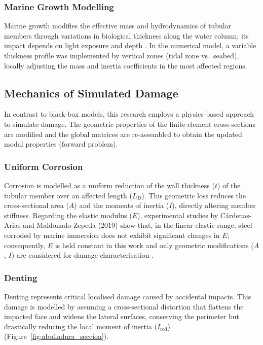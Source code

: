 \documentclass[a4paper,fleqn,nologo]{cas-dc}
\begin{document}
\subsubsection{Marine Growth Modelling}

Marine growth modifies the effective mass and hydrodynamics of tubular members through variations in biological thickness along the water column; its impact depends on light exposure and depth \citep{birci2020integrity,salama2020shm}. In the numerical model, a variable thickness profile was implemented by vertical zones (tidal zone vs.\ seabed), locally adjusting the mass and inertia coefficients in the most affected regions.

\FloatBarrier
\subsection{Mechanics of Simulated Damage}

In contrast to black-box models, this research employs a physics-based approach to simulate damage. The geometric properties of the finite-element cross-sections are modified and the global matrices are re-assembled to obtain the updated modal properties (forward problem).

\subsubsection{Uniform Corrosion}
Corrosion is modelled as a uniform reduction of the wall thickness ($t$) of the tubular member over an affected length ($L_D$). This geometric loss reduces the cross-sectional area ($A$) and the moments of inertia ($I$), directly altering member stiffness. Regarding the elastic modulus ($E$), experimental studies by C\'{a}rdenas-Arias and Maldonado-Zepeda (2019) show that, in the linear elastic range, steel corroded by marine immersion does not exhibit significant changes in $E$; consequently, $E$ is held constant in this work and only geometric modifications ($A$, $I$) are considered for damage characterisation \citep{CardenasArias2019_article}.

\subsubsection{Denting}
Denting represents critical localised damage caused by accidental impacts. This damage is modelled by assuming a cross-sectional distortion that flattens the impacted face and widens the lateral surfaces, conserving the perimeter but drastically reducing the local moment of inertia ($I_{\text{red}}$) (Figure~\ref{fig:abolladura_seccion}).
\end{document}

